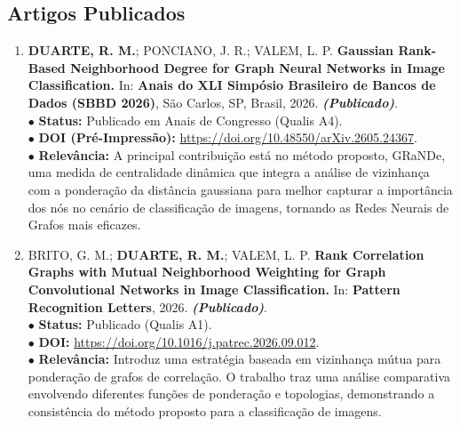 \documentclass[a4paper,10pt]{article}
\begin{document}
\subsection{Artigos Publicados}
\begin{enumerate}[label=\textbf{\arabic*}.] 

    \item \textbf{DUARTE, R. M.}; PONCIANO, J. R.; VALEM, L. P. \textbf{Gaussian Rank-Based Neighborhood Degree for Graph Neural Networks in Image Classification.} In: \textbf{Anais do XLI Simpósio Brasileiro de Bancos de Dados (SBBD 2026)}, São Carlos, SP, Brasil, 2026. \textbf{\textit{(Publicado)}}. \\
    $\bullet$ \textbf{Status:} Publicado em Anais de Congresso (Qualis A4). \\
    $\bullet$ \textbf{DOI (Pré-Impressão):} \url{https://doi.org/10.48550/arXiv.2605.24367}. \\
    $\bullet$ \textbf{Relevância:} A principal contribuição está no método proposto, GRaNDe, uma medida de centralidade dinâmica que integra a análise de vizinhança com a ponderação da distância gaussiana para melhor capturar a importância dos nós no cenário de classificação de imagens, tornando as Redes Neurais de Grafos mais eficazes.

    \item BRITO, G. M.; \textbf{DUARTE, R. M.}; VALEM, L. P. \textbf{Rank Correlation Graphs with Mutual Neighborhood Weighting for Graph Convolutional Networks in Image Classification.} In: \textbf{Pattern Recognition Letters}, 2026. \textbf{\textit{(Publicado)}}. \\
    $\bullet$ \textbf{Status:} Publicado (Qualis A1). \\
    $\bullet$ \textbf{DOI:} \url{https://doi.org/10.1016/j.patrec.2026.09.012}. \\
    $\bullet$ \textbf{Relevância:} Introduz uma estratégia baseada em vizinhança mútua para ponderação de grafos de correlação. O trabalho traz uma análise comparativa envolvendo diferentes funções de ponderação e topologias, demonstrando a consistência do método proposto para a classificação de imagens.

\end{enumerate}
\end{document}
